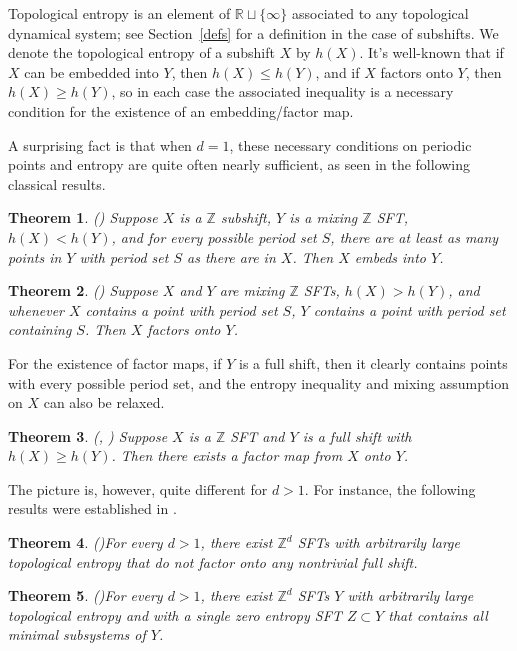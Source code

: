 \documentclass[12pt]{amsart}
\newtheorem{theorem}{Theorem}[section]
\theoremstyle{definition}
\begin{document}
Topological entropy is an element of $\mathbb{R} \sqcup \{\infty\}$ associated to any topological dynamical system; see Section~\ref{defs} for a definition in the case of subshifts. We denote the topological entropy of a subshift $X$ by $h(X)$. It's well-known that if $X$ can be embedded into $Y$, then $h(X) \leq h(Y)$, and if $X$ factors onto $Y$, then $h(X) \geq h(Y)$, so in each case the associated inequality is a necessary condition for the existence of an embedding/factor map. 

A surprising fact is that when $d = 1$, these necessary conditions on periodic points and entropy are quite often nearly sufficient, as seen in the following classical results.

\begin{theorem}{\rm (\cite{krieger})}
Suppose $X$ is a $\mathbb{Z}$ subshift, $Y$ is a mixing $\mathbb{Z}$ SFT, $h(X) < h(Y)$, and for every possible period set $S$, there are at least as many points in $Y$ with period set $S$ as there are in $X$. Then $X$ embeds into $Y$.
\end{theorem}

\begin{theorem}{\rm (\cite{Boyle1983})}
Suppose $X$ and $Y$ are mixing $\mathbb{Z}$ SFTs, $h(X) > h(Y)$, and whenever $X$ contains a point with period set $S$, $Y$ contains a point with period set containing $S$. Then $X$ factors onto $Y$.
\end{theorem}

For the existence of factor maps, if $Y$ is a full shift, then it clearly contains points with every possible period set, and the entropy inequality and mixing assumption on $X$ can also be relaxed.

\begin{theorem}{\rm (\cite{Boyle1983}, \cite{Marcus1979})}
Suppose $X$ is a $\mathbb{Z}$ SFT and $Y$ is a full shift with $h(X) \geq h(Y)$. Then there exists a factor map from $X$ onto $Y$.
\end{theorem}

The picture is, however, quite different for $d > 1$. For instance, the following results were established in \cite{BPS}. 

\begin{theorem}{\rm (\cite{BPS})}\label{BPSthm1}
For every $d > 1$, there exist $\mathbb{Z}^d$ SFTs with arbitrarily large topological entropy that do not factor onto any nontrivial full shift. 
\end{theorem}

\begin{theorem}{\rm (\cite{BPS})}\label{BPSthm2}
For every $d > 1$, there exist $\mathbb{Z}^d$ SFTs $Y$ with arbitrarily large topological entropy and with a single zero entropy SFT $Z \subset Y$ that contains all minimal subsystems of $Y$.
\end{theorem}
\end{document}
